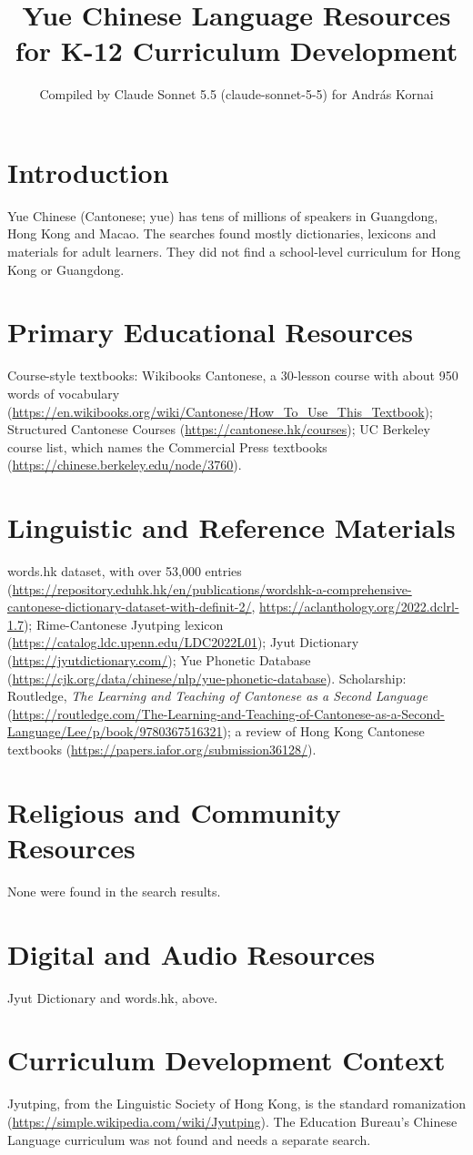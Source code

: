 \documentclass[12pt]{article}
\title{Yue Chinese Language Resources for K-12 Curriculum Development}
\author{Compiled by Claude Sonnet 5.5 (claude-sonnet-5-5) for Andr\'as Kornai}
\date{}
\begin{document}
\maketitle

\section{Introduction}
Yue Chinese (Cantonese; yue) has tens of millions of speakers in Guangdong, Hong Kong and Macao. The searches found mostly dictionaries, lexicons and materials for adult learners. They did not find a school-level curriculum for Hong Kong or Guangdong.

\section{Primary Educational Resources}
Course-style textbooks: Wikibooks Cantonese, a 30-lesson course with about 950 words of vocabulary (\url{https://en.wikibooks.org/wiki/Cantonese/How_To_Use_This_Textbook}); Structured Cantonese Courses (\url{https://cantonese.hk/courses}); UC Berkeley course list, which names the Commercial Press textbooks (\url{https://chinese.berkeley.edu/node/3760}).

\section{Linguistic and Reference Materials}
words.hk dataset, with over 53,000 entries (\url{https://repository.eduhk.hk/en/publications/wordshk-a-comprehensive-cantonese-dictionary-dataset-with-definit-2/}, \url{https://aclanthology.org/2022.dclrl-1.7}); Rime-Cantonese Jyutping lexicon (\url{https://catalog.ldc.upenn.edu/LDC2022L01}); Jyut Dictionary (\url{https://jyutdictionary.com/}); Yue Phonetic Database (\url{https://cjk.org/data/chinese/nlp/yue-phonetic-database}). Scholarship: Routledge, \emph{The Learning and Teaching of Cantonese as a Second Language} (\url{https://routledge.com/The-Learning-and-Teaching-of-Cantonese-as-a-Second-Language/Lee/p/book/9780367516321}); a review of Hong Kong Cantonese textbooks (\url{https://papers.iafor.org/submission36128/}).

\section{Religious and Community Resources}
None were found in the search results.

\section{Digital and Audio Resources}
Jyut Dictionary and words.hk, above.

\section{Curriculum Development Context}
Jyutping, from the Linguistic Society of Hong Kong, is the standard romanization (\url{https://simple.wikipedia.com/wiki/Jyutping}). The Education Bureau's Chinese Language curriculum was not found and needs a separate search.
\end{document}
